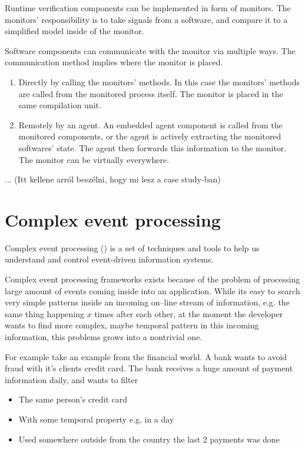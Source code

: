 Runtime verification components can be implemented in form of monitors. The monitors' responsibility is to take signals from a software, and compare it to a simplified model inside of the monitor.

Software components can communicate with the monitor via multiple ways. The communication method implies where the monitor is placed.
\begin{enumerate}
	\item Directly by calling the monitors' methods. In this case the monitors' methods are called from the monitored process itself. The monitor is placed in the same compilation unit.
	      \item\label{item:agent} Remotely by an agent. An embedded agent component is called from the monitored components, or the agent is actively extracting the monitored softwares' state. The agent then forwards this information to the monitor. The monitor can be virtually everywhere.
\end{enumerate}

... (Itt kellene arról beszélni, hogy mi lesz a case study-ban)

\section{Complex event processing}

Complex event processing (\cep) is a set of techniques and tools to help us understand and control event-driven information systems.\citep{Luckham:2001:PEI:515781}

Complex event processing frameworks exists because of the problem of processing large amount of events coming inside into an application. While its easy to search  very simple patterns inside an incoming on--line stream of information, e.g. the same thing happening $x$ times after each other, at the moment the developer wants to find more complex, maybe temporal pattern in this incoming information, this problems grows into a nontrivial one.

For example take an example from the financial world. A bank wants to avoid fraud with it's clients credit card. The bank receives a huge amount of payment information daily, and wants to filter
\begin{itemize}
	\item The same person's credit card
	\item With some temporal property e.g. in a day
	\item Used somewhere outside from the country the last 2 payments was done
\end{itemize}

